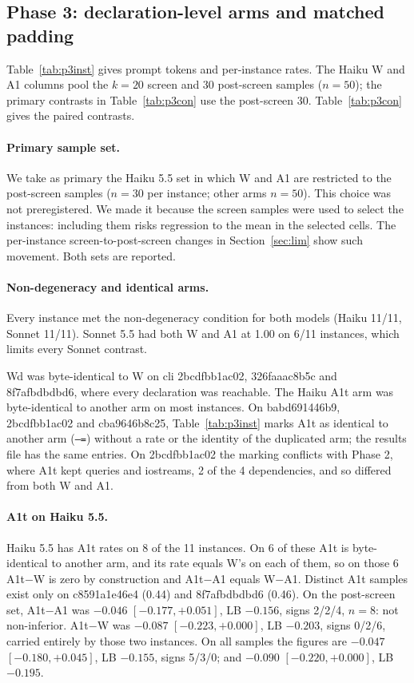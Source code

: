 \subsection{Phase 3: declaration-level arms and matched padding}

Table~\ref{tab:p3inst} gives prompt tokens and per-instance rates. The Haiku W and A1 columns pool the $k=20$ screen and 30 post-screen samples ($n=50$); the primary contrasts in Table~\ref{tab:p3con} use the post-screen 30. Table~\ref{tab:p3con} gives the paired contrasts.

\paragraph{Primary sample set.} We take as primary the Haiku 5.5 set in which W and A1 are restricted to the post-screen samples ($n=30$ per instance; other arms $n=50$). This choice was not preregistered. We made it because the screen samples were used to select the instances: including them risks regression to the mean in the selected cells. The per-instance screen-to-post-screen changes in Section~\ref{sec:lim} show such movement. Both sets are reported.

\paragraph{Non-degeneracy and identical arms.} Every instance met the non-degeneracy condition for both models (Haiku 11/11, Sonnet 11/11). Sonnet 5.5 had both W and A1 at 1.00 on 6/11 instances, which limits every Sonnet contrast.

Wd was byte-identical to W on cli 2bcdfbb1ac02, 326faaac8b5c and 8f7afbdbdbd6, where every declaration was reachable. The Haiku A1t arm was byte-identical to another arm on most instances. On babd691446b9, 2bcdfbb1ac02 and cba9646b8c25, Table~\ref{tab:p3inst} marks A1t as identical to another arm (\texttt{--=}) without a rate or the identity of the duplicated arm; the results file has the same entries. On 2bcdfbb1ac02 the marking conflicts with Phase 2, where A1t kept queries and iostreams, 2 of the 4 dependencies, and so differed from both W and A1.

\paragraph{A1t on Haiku 5.5.} Haiku 5.5 has A1t rates on 8 of the 11 instances. On 6 of these A1t is byte-identical to another arm, and its rate equals W's on each of them, so on those 6 A1t$-$W is zero by construction and A1t$-$A1 equals W$-$A1. Distinct A1t samples exist only on c8591a1e46e4 (0.44) and 8f7afbdbdbd6 (0.46). On the post-screen set, A1t$-$A1 was $-0.046$ $[-0.177, +0.051]$, LB $-0.156$, signs 2/2/4, $n=8$: not non-inferior. A1t$-$W was $-0.087$ $[-0.223, +0.000]$, LB $-0.203$, signs 0/2/6, carried entirely by those two instances. On all samples the figures are $-0.047$ $[-0.180, +0.045]$, LB $-0.155$, signs 5/3/0; and $-0.090$ $[-0.220, +0.000]$, LB $-0.195$.

